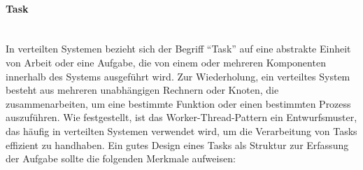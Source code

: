 \paragraph{Task\\\\}

In verteilten Systemen bezieht sich der Begriff \enquote{Task} auf eine abstrakte Einheit von Arbeit oder eine Aufgabe, die von einem oder mehreren Komponenten innerhalb des Systems ausgeführt wird. Zur Wiederholung, ein verteiltes System besteht aus mehreren unabhängigen Rechnern oder Knoten, die zusammenarbeiten, um eine bestimmte Funktion oder einen bestimmten Prozess auszuführen. Wie festgestellt, ist das Worker-Thread-Pattern ein Entwurfsmuster, das häufig in verteilten Systemen verwendet wird, um die Verarbeitung von Tasks effizient zu handhaben. Ein gutes Design eines Tasks als Struktur zur Erfassung der Aufgabe sollte die folgenden Merkmale aufweisen:

